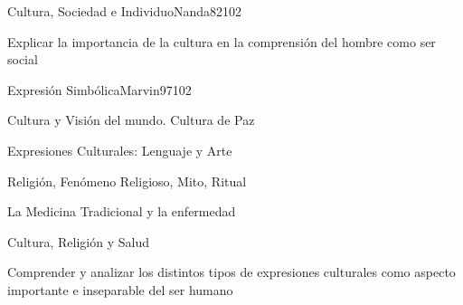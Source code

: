\begin{syllabus}
\begin{unit}{Cultura, Sociedad e Individuo}{Nanda82}{10}{2}
   \begin{unitgoals}
      \item Explicar la importancia de la cultura en la comprensión del hombre como ser social
   \end{unitgoals}
\end{unit}

\begin{unit}{Expresión Simbólica}{Marvin97}{10}{2}
   \begin{topics}
      \item Cultura y Visión del mundo. Cultura de Paz
	\item Expresiones Culturales: Lenguaje y Arte
	\item Religión, Fenómeno Religioso, Mito, Ritual
	\item La Medicina Tradicional y la enfermedad
	\item Cultura, Religión y Salud
   \end{topics}

   \begin{unitgoals}
      \item Comprender y analizar los distintos tipos de expresiones culturales como aspecto importante e inseparable del ser humano
   \end{unitgoals}
\end{unit}

\begin{coursebibliography}
\end{coursebibliography}
\end{syllabus}
